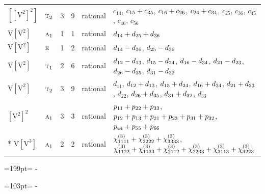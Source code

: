 \documentclass[10pt,a4paper]{article}
\newcommand{\needspace}[1]{\par\penalty-100\begingroup\dimen0=#1\relax\dimen2=\pagegoal
  \advance\dimen2-\pagetotal\ifdim\dimen0>\dimen2\relax\ifdim\dimen2>0pt\vfil\break\fi\fi
  \endgroup}
\numberwithin{equation}{section}
\newcommand{\irr}[1]{\text{\normalfont\scshape #1}}
\newcommand{\jahn}[1]{\mathrm{#1}}
\newlength{\fillwidth}\newlength{\cellwidth}\newlength{\colwidth}
\newcommand{\signbreak}{\penalty100\relax}
\begin{document}
{\begin{longtable}{@{}llrrl>{\RaggedRight\arraybackslash}p{\fillwidth}@{}}
$\jahn{[[V^{2}]^{2}]}$ & $\irr{t}_{2}$ & 3 & 9 & rational & $c_{14}$, $c_{15} +\signbreak c_{35}$, $c_{16} +\signbreak c_{26}$, $c_{24} +\signbreak c_{34}$, $c_{25}$, $c_{36}$, $c_{45}$, $c_{46}$, $c_{56}$\\
$\jahn{V[V^{2}]}$ & $\irr{a}_{1}$ & 1 & 1 & rational & $d_{14} +\signbreak d_{25} +\signbreak d_{36}$\\
$\jahn{V[V^{2}]}$ & $\irr{e}$ & 1 & 2 & rational & $d_{14} -\signbreak d_{36}$, $d_{25} -\signbreak d_{36}$\\
$\jahn{V[V^{2}]}$ & $\irr{t}_{1}$ & 2 & 6 & rational & $d_{12} -\signbreak d_{13}$, $d_{15} -\signbreak d_{24}$, $d_{16} -\signbreak d_{34}$, $d_{21} -\signbreak d_{23}$, $d_{26} -\signbreak d_{35}$, $d_{31} -\signbreak d_{32}$\\
$\jahn{V[V^{2}]}$ & $\irr{t}_{2}$ & 3 & 9 & rational & $d_{11}$, $d_{12} +\signbreak d_{13}$, $d_{15} +\signbreak d_{24}$, $d_{16} +\signbreak d_{34}$, $d_{21} +\signbreak d_{23}$, $d_{22}$, $d_{26} +\signbreak d_{35}$, $d_{31} +\signbreak d_{32}$, $d_{33}$\\
$\jahn{[V^{2}]^{2}}$ & $\irr{a}_{1}$ & 3 & 3 & rational & $p_{11} +\signbreak p_{22} +\signbreak p_{33}$, $p_{12} +\signbreak p_{13} +\signbreak p_{21} +\signbreak p_{23} +\signbreak p_{31} +\signbreak p_{32}$, $p_{44} +\signbreak p_{55} +\signbreak p_{66}$\\*
$\jahn{V[V^{3}]}$ & $\irr{a}_{1}$ & 2 & 2 & rational & $\chi^{(3)}_{1111} +\signbreak \chi^{(3)}_{2222} +\signbreak \chi^{(3)}_{3333}$, $\chi^{(3)}_{1122} +\signbreak \chi^{(3)}_{1133} +\signbreak \chi^{(3)}_{2112} +\signbreak \chi^{(3)}_{2233} +\signbreak \chi^{(3)}_{3113} +\signbreak \chi^{(3)}_{3223}$\\
\bottomrule\end{longtable}}
\needspace{199pt}
\needspace{103pt}
\end{document}
